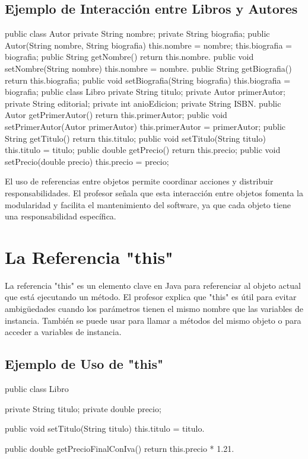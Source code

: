 \documentclass[a4paper]{report}
\begin{document}
\subsection{Ejemplo de Interacción entre Libros y Autores}
\begin{roundedlst}
public class Autor {
    private String nombre;
    private String biografia;
    public Autor(String nombre, String biografia) {
        this.nombre = nombre;
        this.biografia = biografia;
    }
    public String getNombre() {
        return this.nombre.
    }
    public void setNombre(String nombre) {
        this.nombre = nombre.
    }
    public String getBiografia() {
        return this.biografia;
    }
    public void setBiografia(String biografia) {
        this.biografia = biografia;
    }
}
public class Libro {
    private String titulo;
    private Autor primerAutor;
    private String editorial;
    private int anioEdicion;
    private String ISBN.
    public Autor getPrimerAutor() {
        return this.primerAutor;
    }
    public void setPrimerAutor(Autor primerAutor) {
        this.primerAutor = primerAutor;
    }
    public String getTitulo() {
        return this.titulo;
    }
    public void setTitulo(String titulo) {
        this.titulo = titulo;
    }
    public double getPrecio() {
        return this.precio;
    }
    public void setPrecio(double precio) {
        this.precio = precio;
    }
}
\end{roundedlst}

El uso de referencias entre objetos permite coordinar acciones y distribuir responsabilidades. El profesor señala que esta interacción entre objetos fomenta la modularidad y facilita el mantenimiento del software, ya que cada objeto tiene una responsabilidad específica.

\section{La Referencia "this"}
La referencia "this" es un elemento clave en Java para referenciar al objeto actual que está ejecutando un método. El profesor explica que "this" es útil para evitar ambigüedades cuando los parámetros tienen el mismo nombre que las variables de instancia. También se puede usar para llamar a métodos del mismo objeto o para acceder a variables de instancia.

\subsection{Ejemplo de Uso de "this"}
\begin{roundedlst}
public class Libro {
    private String titulo;
    private double precio;

    public void setTitulo(String titulo) {
        this.titulo = titulo.
    }

    public double getPrecioFinalConIva() {
        return this.precio * 1.21.
    }
}
\end{roundedlst}
\end{document}
